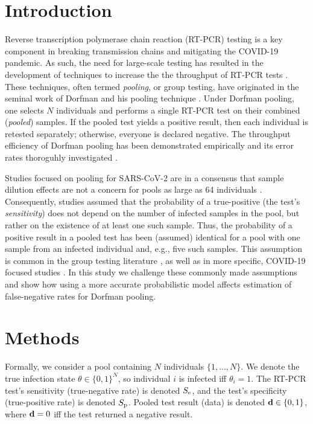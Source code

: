 \documentclass{article}
\begin{document}
\section*{Introduction}
Reverse transcription polymerase chain reaction (RT-PCR) testing is a
key component in breaking transmission chains and mitigating the
COVID-19 pandemic. As such, the need for large-scale testing has
resulted in the development of techniques to increase the the
throughput of RT-PCR tests \cite{DorfmanYuvalDor, PoolSize30,
  BayesianDorfman, MatrixPooling, LionDorfman}. These techniques,
often termed \emph{pooling}, or group testing, have originated in the
seminal work of Dorfman and his pooling technique
\cite{DorfmanOriginal, DorfmanYuvalDor}. Under Dorfman pooling, one
selects $N$ individuals and performs a single RT-PCR test on their
combined (\emph{pooled}) samples. If the pooled test yields a positive
result, then each individual is retested separately; otherwise,
everyone is declared negative. The throughput efficiency of Dorfman
pooling has been demonstrated empirically \cite{DorfmanYuvalDor} and
its error rates thoroguhly investigated \cite{Kim, Simplistic1,
  OptimalDorfmanPool}.

Studies focused on pooling for SARS-CoV-2 are in a consensus that
sample dilution effects \cite{DilutionHIV, GroupDilution} are not a
concern for pools as large as 64 individuals \cite{PoolSize30, Lion,
  DorfmanYuvalDor, DilutionCOVID}. Consequently, studies assumed that
the probability of a true-positive (the test's \emph{sensitivity})
does not depend on the number of infected samples in the pool, but
rather on the existence of at least one such sample. Thus, the
probability of a positive result in a pooled test has been (assumed)
identical for a pool with one sample from an infected individual and,
e.g., five such samples. This assumption is common in the group
testing literature \cite{Kim, OptimalDorfmanPool}, as well as in more
specific, COVID-19 focused studies \cite{Simplistic1, Simplistic2}. In
this study we challenge these commonly made assumptions and show how
using a more accurate probabilistic model affects estimation of
false-negative rates for Dorfman pooling.

\section*{Methods}
Formally, we consider a pool containing $N$ individuals
$\{1,\dots,N\}$. We denote the true infection state $\theta \in
\{0,1\}^N$, so individual $i$ is infected iff $\theta_i=1$. The RT-PCR
test's sensitivity (true-negative rate) is denoted $S_{\text{e}}$, and the
test's specificity (true-positive rate) is denoted $S_{\text{p}}$. Pooled
test result (data) is denoted $\mathbf{d} \in \{0,1\}$, where $\mathbf{d}=0$ iff
the test returned a negative result.
\end{document}
